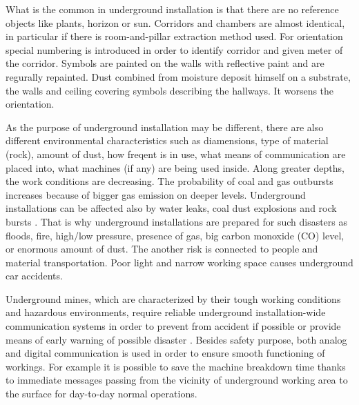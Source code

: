 \documentclass[../main.tex]{subfiles}
\begin{document}
What is the common in underground installation is that there are no reference objects like plants, horizon or sun. Corridors and chambers are almost identical, in particular if there is room-and-pillar extraction method used. For orientation special numbering is introduced in order to identify corridor and given meter of the corridor. Symbols are painted on the walls with reflective paint and are regurally repainted. Dust combined from moisture deposit himself on a substrate, the walls and ceiling covering symbols describing the hallways. It worsens the orientation.

As the purpose of underground installation may be different, there are also different environmental characteristics such as diamensions, type of material (rock), amount of dust, how freqent is in use, what means of communication are placed into, what machines (if any) are being used inside. Along greater depths, the work conditions are decreasing. The probability of coal and gas outbursts increases because of bigger gas emission on deeper levels. Underground installations can be affected also by water leaks, coal dust explosions and rock bursts \cite{WSN_monitoring}. That is why underground installations are prepared for such disasters as floods, fire, high/low pressure, presence of gas, big carbon monoxide (CO) level, or enormous amount of dust. The another risk is connected to people and material transportation. Poor light and narrow working space causes underground car accidents.

Underground mines, which are characterized by their tough working conditions and hazardous environments, require reliable underground installation-wide communication systems in order to prevent from accident if possible or provide means of early warning of possible disaster \cite{Book_wireless_in_mines}. Besides safety purpose, both analog and digital communication is used in order to ensure smooth functioning of workings. For example it is possible to save the machine breakdown time thanks to immediate messages passing  from the vicinity of underground working area to the surface for day-to-day normal operations.
\end{document}
